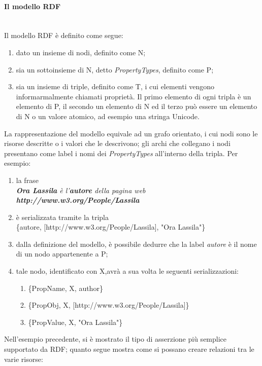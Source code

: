 \documentclass[12pt,a4paper,twoside]{book}
\begin{document}
\paragraph{Il modello RDF}\mbox{}\\
Il modello RDF è definito come segue\cite{RDF}:
\begin{enumerate}
\item dato un insieme di nodi, definito come N;
\item sia un sottoinsieme di N, detto \textit{PropertyTypes}, definito come P;
\item sia un insieme di triple, definito come T, i cui elementi vengono informarmalmente chiamati proprietà. Il primo elemento di ogni tripla è un elemento di P, il secondo un elemento di N ed il terzo può essere un elemento di N o un valore atomico, ad esempio una stringa Unicode.
\end{enumerate}
La rappresentazione del modello equivale ad un grafo orientato, i cui nodi sono le risorse descritte o i valori che le descrivono; gli archi che collegano i nodi presentano come label i nomi dei \textit{PropertyTypes} all'interno della tripla. Per esempio:
\begin{enumerate}
\item la frase \\\textit{\textbf{Ora Lassila} è l'\textbf{autore} della pagina web \textbf{http://www.w3.org/People/Lassila}}
\item è serializzata tramite la tripla \\ \{autore, [http://www.w3.org/People/Lassila], "Ora Lassila"\}
\item dalla definizione del modello, è possibile dedurre che la label \textit{autore} è il nome di un nodo appartenente a P;
\item tale nodo, identificato con X,avrà a sua volta le seguenti serializzazioni:
\begin{enumerate}
\item \{PropName,  X, author\}
\item \{PropObj,   X, [http://www.w3.org/People/Lassila]\}
\item \{PropValue, X, "Ora Lassila"\}
\end{enumerate}

\end{enumerate}
Nell'esempio precedente, si è mostrato il tipo di asserzione più semplice supportato da RDF; quanto segue mostra come si possano creare relazioni tra le varie risorse:
\end{document}

